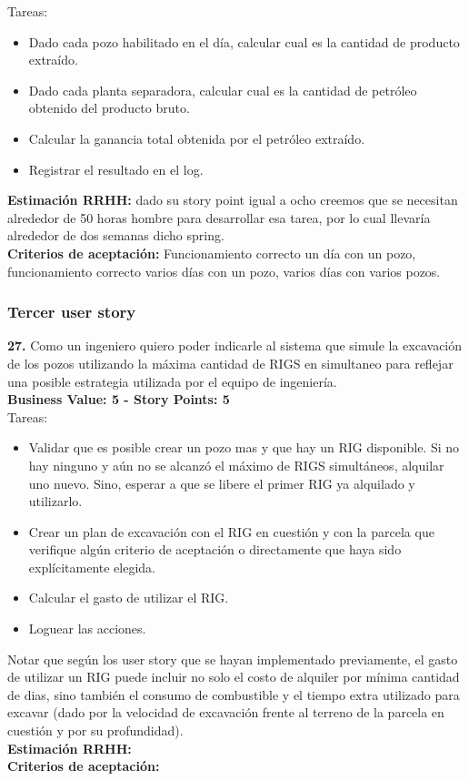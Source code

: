 Tareas:

\begin{itemize}
    \item Dado cada pozo habilitado en el día, calcular cual es la cantidad de producto extraído.
    \item Dado cada planta separadora, calcular cual es la cantidad de petróleo obtenido del producto bruto.
    \item Calcular la ganancia total obtenida por el petróleo extraído.
    \item Registrar el resultado en el log.
\end{itemize}

\textbf{Estimaci\'on RRHH:}
dado su story point igual a ocho creemos que se necesitan alrededor de 50 horas hombre para desarrollar esa tarea, por lo cual llevar\'ia alrededor de dos semanas dicho spring.\\

\textbf{Criterios de aceptaci\'on:}
Funcionamiento correcto un d\'ia con un pozo, funcionamiento correcto varios d\'ias con un pozo, varios d\'ias con varios pozos.

\subsubsection{Tercer user story}

\textbf{27.} Como un ingeniero quiero poder indicarle al sistema que simule la excavación de los pozos utilizando la máxima cantidad de RIGS en simultaneo para reflejar una posible estrategia utilizada por el equipo de ingeniería.\\
\textbf{Business Value: 5 - Story Points: 5}\\

Tareas:

\begin{itemize}
    \item Validar que es posible crear un pozo mas y que hay un RIG disponible. Si no hay ninguno y aún no se alcanzó el máximo de RIGS simultáneos, alquilar uno nuevo. Sino, esperar a que se libere el primer RIG ya alquilado y utilizarlo.
    \item Crear un plan de excavación con el RIG en cuestión y con la parcela que verifique algún criterio de aceptación o directamente que haya sido explícitamente elegida.
    \item Calcular el gasto de utilizar el RIG.
    \item Loguear las acciones.
\end{itemize}

Notar que según los user story que se hayan implementado previamente, el gasto de utilizar un RIG puede incluir no solo el costo de alquiler por mínima cantidad de dias, sino también el consumo de combustible y el tiempo extra utilizado para excavar (dado por la velocidad de excavación frente al terreno de la parcela en cuestión y por su profundidad).\\

\textbf{Estimaci\'on RRHH:}
\\

\textbf{Criterios de aceptaci\'on:}